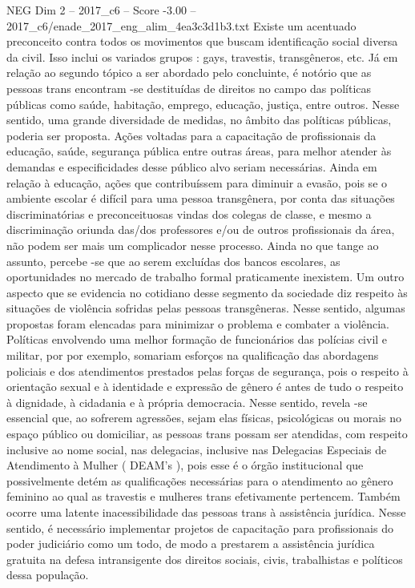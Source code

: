 \begin{textsample}{NEG Dim 2 – 2017\_c6 – Score -3.00 – 2017\_c6/enade\_2017\_eng\_alim\_4ea3c3d1b3.txt}
Existe um acentuado preconceito contra todos os movimentos que buscam identificação social diversa da civil.
Isso inclui os variados grupos : gays, travestis, transgêneros, etc.
Já em relação ao segundo tópico a ser abordado pelo concluinte, é notório que as pessoas trans encontram -se destituídas de direitos no campo das políticas públicas como saúde, habitação, emprego, educação, justiça, entre outros.
Nesse sentido, uma grande diversidade de medidas, no âmbito das políticas públicas, poderia ser proposta.
Ações voltadas para a capacitação de profissionais da educação, saúde, segurança pública entre outras áreas, para melhor atender às demandas e especificidades desse público alvo seriam necessárias.
Ainda em relação à educação, ações que contribuíssem para diminuir a evasão, pois se o ambiente escolar é difícil para uma pessoa transgênera, por conta das situações discriminatórias e preconceituosas vindas dos colegas de classe, e mesmo a discriminação oriunda das/dos professores e/ou de outros profissionais da área, não podem ser mais um complicador nesse processo.
Ainda no que tange ao assunto, percebe -se que ao serem excluídas dos bancos escolares, as oportunidades no mercado de trabalho formal praticamente inexistem.
Um outro aspecto que se evidencia no cotidiano desse segmento da sociedade diz respeito às situações de violência sofridas pelas pessoas transgêneras.
Nesse sentido, algumas propostas foram elencadas para minimizar o problema e combater a violência.
Políticas envolvendo uma melhor formação de funcionários das polícias civil e militar, por por exemplo, somariam esforços na qualificação das abordagens policiais e dos atendimentos prestados pelas forças de segurança, pois o respeito à orientação sexual e à identidade e expressão de gênero é antes de tudo o respeito à dignidade, à cidadania e à própria democracia.
Nesse sentido, revela -se essencial que, ao sofrerem agressões, sejam elas físicas, psicológicas ou morais no espaço público ou domiciliar, as pessoas trans possam ser atendidas, com respeito inclusive ao nome social, nas delegacias, inclusive nas Delegacias Especiais de Atendimento à Mulher ( DEAM’s ), pois esse é o órgão institucional que possivelmente detém as qualificações necessárias para o atendimento ao gênero feminino ao qual as travestis e mulheres trans efetivamente pertencem.
Também ocorre uma latente inacessibilidade das pessoas trans à assistência jurídica.
Nesse sentido, é necessário implementar projetos de capacitação para profissionais do poder judiciário como um todo, de modo a prestarem a assistência jurídica gratuita na defesa intransigente dos direitos sociais, civis, trabalhistas e políticos dessa população.

\end{textsample}
